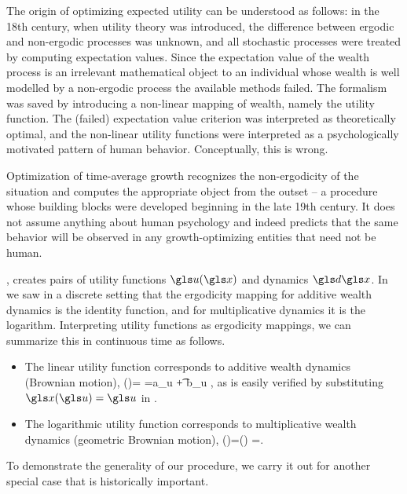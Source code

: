 The origin of optimizing expected utility can
be understood as follows: in the 18th century, when utility theory was introduced, 
the difference between
ergodic and non-ergodic processes was unknown, and all stochastic
processes were treated by computing expectation values. Since
the expectation value of the wealth process is an irrelevant 
mathematical object to an individual whose wealth is well modelled by
a non-ergodic process the available methods
failed. The formalism was saved by introducing a non-linear mapping of
wealth, namely the utility function. The (failed) expectation value criterion
was interpreted as theoretically optimal, and the non-linear utility functions
were interpreted as a psychologically motivated pattern of human behavior. 
Conceptually,  this is wrong.

Optimization of time-average growth
recognizes the non-ergodicity of the situation  and computes the
appropriate object from the outset -- a procedure whose building blocks
were developed beginning in the late 19th century. It does not assume 
anything about human psychology and indeed predicts that the 
same behavior will be observed in any growth-optimizing entities that
need not be human.

, creates pairs of utility functions $\gu(\x)$ and dynamics
$\gd\x$. In  we saw in a discrete setting that the ergodicity mapping for 
additive wealth dynamics is the identity function, and for multiplicative dynamics it is the logarithm. Interpreting utility functions as ergodicity mappings, we can summarize this in continuous time as follows.

\begin{itemize}
\item
The linear utility function corresponds to additive wealth dynamics (Brownian motion),
\be
\gu(\x)=\x \hspace{.4cm} \leftrightarrow \hspace{.4cm} \gd\x=a_u \gd\t + b_u \gd\gW,\hspace{1.3cm}
\ee
as is easily verified by substituting $\x(\gu)=\gu$ in .
\item
The logarithmic utility function corresponds to multiplicative wealth dynamics (geometric Brownian motion),
\be
\gu(\x)=\ln(\x) \hspace{.4cm} \leftrightarrow \hspace{.4cm} \gd\x=\x{}.
\ee
\end{itemize}
To demonstrate the generality of our procedure, we carry it out for another 
special case that is historically important.

